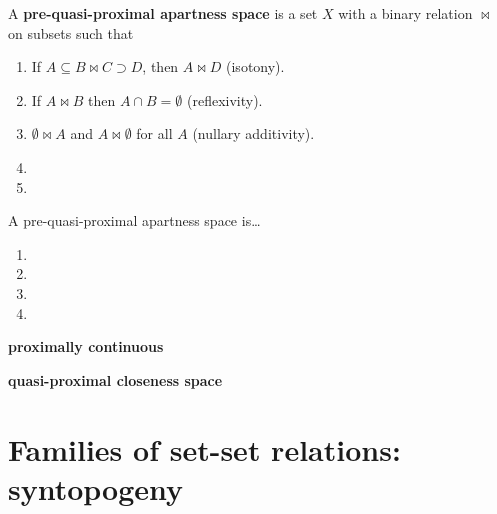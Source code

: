 \documentclass{article}
\def\Rpd{[0,\infty]_d}
\begin{document}
\begin{defn}
  A \textbf{pre-quasi-proximal apartness space} is a set $X$ with a binary relation $\bowtie$ on subsets such that
  \begin{enumerate}
  \item If $A\subseteq B \bowtie C \supset D$, then $A\bowtie D$ (isotony).
  \item If $A\bowtie B$ then $A\cap B = \emptyset$ (reflexivity).
  \item $\emptyset \bowtie A$ and $A\bowtie \emptyset$ for all $A$ (nullary additivity).
  \item 
  \item 
  \end{enumerate}
  A pre-quasi-proximal apartness space is\dots
  \begin{enumerate}[resume]
  \item 
  \item 
  \item 
  \item 
  \end{enumerate}
  \textbf{proximally continuous}
\end{defn}

\begin{defn}
  \textbf{quasi-proximal closeness space}
\end{defn}


\section{Families of set-set relations: syntopogeny}
\label{sec:syntopogeny}





\end{document}
